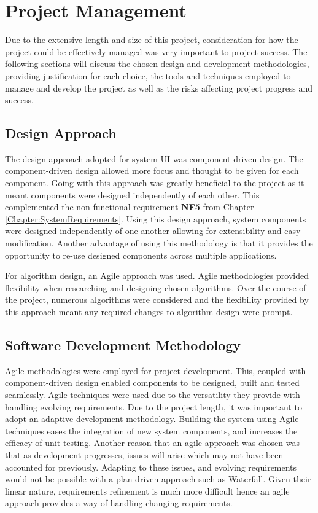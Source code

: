 \chapter{Project Management}
\label{Chapter:ProjectManagement}
Due to the extensive length and size of this project, consideration for how the project could be effectively managed was very important to project success. The following sections will discuss the chosen design and development methodologies, providing justification for each choice, the tools and techniques employed to manage and develop the project as well as the risks affecting project progress and success.

\section{Design Approach}
The design approach adopted for system UI was component-driven design. The component-driven design allowed more focus and thought to be given for each component. Going with this approach was greatly beneficial to the project as it meant components were designed independently of each other. This complemented the non-functional requirement \textbf{NF5} from Chapter \ref{Chapter:SystemRequirements}. Using this design approach, system components were designed independently of one another allowing for extensibility and easy modification. Another advantage of using this methodology is that it provides the opportunity to re-use designed components across multiple applications. 

For algorithm design, an Agile approach was used. Agile methodologies provided flexibility when researching and designing chosen algorithms. Over the course of the project, numerous algorithms were considered and the flexibility provided by this approach meant any required changes to algorithm design were prompt.

\section{Software Development Methodology}
Agile methodologies were employed for project development. This, coupled with component-driven design enabled components to be designed, built and tested seamlessly. Agile techniques were used due to the versatility they provide with handling evolving requirements. Due to the project length, it was important to adopt an adaptive development methodology. Building the system using Agile techniques eases the integration of new system components, and increases the efficacy of unit testing. Another reason that an agile approach was chosen was that as development progresses, issues will arise which may not have been accounted for previously. Adapting to these issues, and evolving requirements would not be possible with a plan-driven approach such as Waterfall. Given their linear nature, requirements refinement is much more difficult hence an agile approach provides a way of handling changing requirements. 

